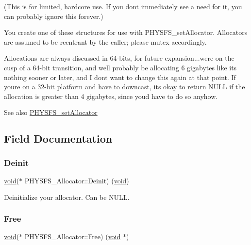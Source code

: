 (This is for limited, hardcore use. If you don\textquotesingle{}t immediately see a need for it, you can probably ignore this forever.)

You create one of these structures for use with P\+H\+Y\+S\+F\+S\+\_\+set\+Allocator. Allocators are assumed to be reentrant by the caller; please mutex accordingly.

Allocations are always discussed in 64-\/bits, for future expansion...we\textquotesingle{}re on the cusp of a 64-\/bit transition, and we\textquotesingle{}ll probably be allocating 6 gigabytes like it\textquotesingle{}s nothing sooner or later, and I don\textquotesingle{}t want to change this again at that point. If you\textquotesingle{}re on a 32-\/bit platform and have to downcast, it\textquotesingle{}s okay to return N\+U\+LL if the allocation is greater than 4 gigabytes, since you\textquotesingle{}d have to do so anyhow.

\begin{DoxySeeAlso}{See also}
\hyperlink{physfs_8h_ae6297d1ae7755b9236b01950bfbb0ef1}{P\+H\+Y\+S\+F\+S\+\_\+set\+Allocator} 
\end{DoxySeeAlso}


\subsection{Field Documentation}
\mbox{\label{struct_p_h_y_s_f_s___allocator_a34a667936ebcb017a58edfd4695a6e77}} 
\subsubsection{\texorpdfstring{Deinit}{Deinit}}
{\footnotesize\ttfamily \hyperlink{png_8h_ac9c84fa68bbad002983e35ce3663c686}{void}($\ast$ P\+H\+Y\+S\+F\+S\+\_\+\+Allocator\+::\+Deinit) (\hyperlink{png_8h_ac9c84fa68bbad002983e35ce3663c686}{void})}

Deinitialize your allocator. Can be N\+U\+LL. \mbox{\label{struct_p_h_y_s_f_s___allocator_ad281f87d133a480afa98182967c7e313}} 
\subsubsection{\texorpdfstring{Free}{Free}}
{\footnotesize\ttfamily \hyperlink{png_8h_ac9c84fa68bbad002983e35ce3663c686}{void}($\ast$ P\+H\+Y\+S\+F\+S\+\_\+\+Allocator\+::\+Free) (\hyperlink{png_8h_ac9c84fa68bbad002983e35ce3663c686}{void} $\ast$)}

